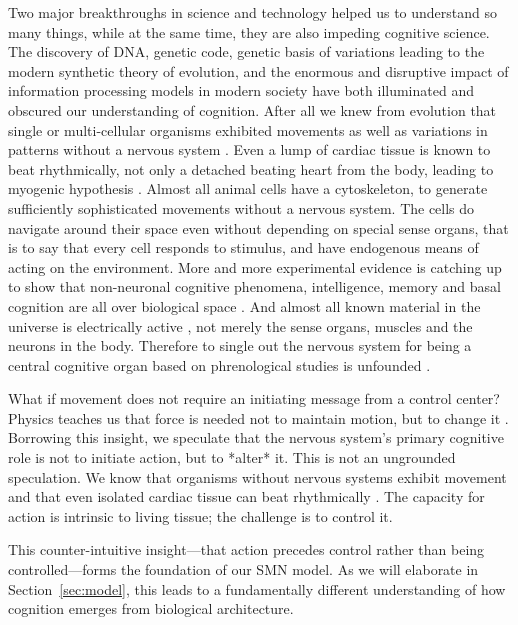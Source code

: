 Two major breakthroughs in science and technology helped us to understand so many things, while at the same time, they are also impeding cognitive science. The discovery of DNA, genetic code, genetic basis of variations leading to the modern synthetic theory of evolution, and the enormous and disruptive impact of information processing models in modern society have both illuminated and obscured our understanding of cognition. After all we knew from evolution that single or multi-cellular organisms exhibited movements as well as variations in patterns without a nervous system \citep{llinas2002vortex}. Even a lump of cardiac tissue is known to beat rhythmically, not only a detached beating heart from the body, leading to myogenic hypothesis \citep{landecker2007culturing}. Almost all animal cells have a cytoskeleton, to generate sufficiently sophisticated movements without a nervous system. The cells do navigate around their space even without depending on special sense organs, that is to say that every cell responds to stimulus, and have endogenous means of acting on the environment. More and more experimental evidence is catching up to show that non-neuronal cognitive phenomena, intelligence, memory and basal cognition are all over biological space \citep{Levin2023, biomimetics-Levin2023}. And almost all known material in the universe is electrically active \citep{Peratt1996plasma}, not merely the sense organs, muscles and the neurons in the body. Therefore to single out the nervous system for being a central cognitive organ based on phrenological studies is unfounded \citep{anderson2014phrenology}.

What if movement does not require an initiating message from a control center? Physics teaches us that force is needed not to maintain motion, but to change it \cite{newton1687principia}. Borrowing this insight, we speculate that the nervous system's primary cognitive role is not to initiate action, but to *alter* it. This is not an ungrounded speculation. We know that organisms without nervous systems exhibit movement and that even isolated cardiac tissue can beat rhythmically \citep{llinas2002vortex, landecker2007culturing}. The capacity for action is intrinsic to living tissue; the challenge is to control it.

This counter-intuitive insight—that action precedes control rather than being controlled—forms the foundation of our SMN model. As we will elaborate in Section~\ref{sec:model}, this leads to a fundamentally different understanding of how cognition emerges from biological architecture.

